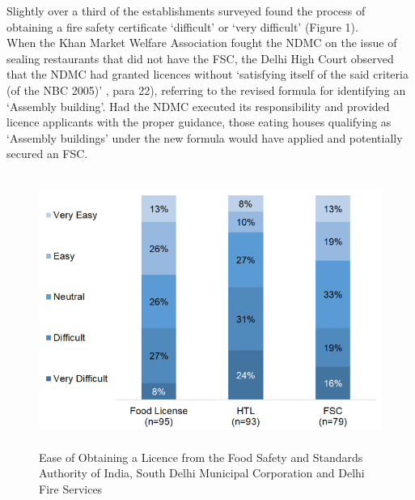 \documentclass[a4paper, 12pt, twoside]{article}
\begin{document}
		Slightly over a third of the establishments surveyed found the process of obtaining a fire safety certificate ‘difficult’ or ‘very difficult’ (Figure 1). \\
		
		When the Khan Market Welfare Association fought the NDMC on the issue of sealing restaurants that did not have the FSC, the Delhi High Court observed that the NDMC had granted licences without ‘satisfying itself of the said criteria (of the NBC 
2005)’ \parencite{dhc2016_kmwavndmc}, para 22), referring to the revised formula for identifying an ‘Assembly building’. Had the NDMC executed its responsibility and provided licence applicants with the proper guidance, those eating houses qualifying as ‘Assembly buildings’ under the new formula would have applied and potentially secured an FSC. \\%
		\begin{figure}[H]
                    	\centering
                    	\includegraphics[height = 3.5in]{Figure1.png}
                    	\captionsetup{justification=centering}\caption[Optional Caption]{Ease of Obtaining a Licence from the Food Safety and Standards Authority of India, South Delhi Municipal Corporation and Delhi Fire Services}
		\end{figure}
                
\end{document}
